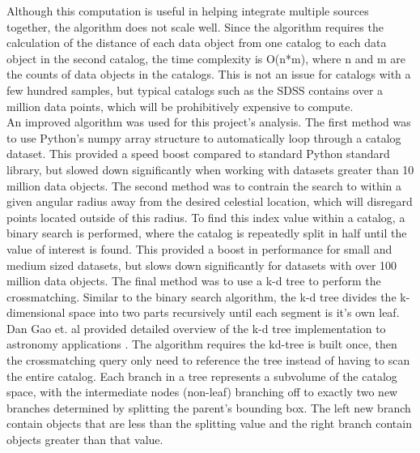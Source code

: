 \documentclass[11pt,sigconf]{acmart}
\begin{document}
Although this computation is useful in helping integrate multiple sources together, 
the algorithm does not scale well. Since the algorithm requires the calculation of
the distance of each data object from one catalog to each data object in the second
catalog, the time complexity is O(n*m), where n and m are the counts of data objects
in the catalogs. This is not an issue for catalogs with a few hundred samples,
but typical catalogs such as the SDSS contains over a million data points, which will
be prohibitively expensive to compute.
\\
An improved algorithm was used for this project's analysis. The first method was to
use Python's numpy array structure to automatically loop through a catalog dataset. This
provided a speed boost compared to standard Python standard library, but slowed down
significantly when working with datasets greater than 10 million data objects. The second
method was to contrain the search to within a given angular radius away from the desired
celestial location, which will disregard points located outside of this radius. To find
this index value within a catalog, a binary search is performed, where the catalog is 
repeatedly split in half until the value of interest is found. This provided a boost in
performance for small and medium sized datasets, but slows down significantly for datasets 
with over 100 million data objects. The final method was to use a k-d tree to perform
the crossmatching. Similar to the binary search algorithm, the k-d tree divides the 
k-dimensional space into two parts recursively until each segment is it's own leaf.  
\\
Dan Gao et. al provided detailed overview of the k-d tree implementation to astronomy 
applications \cite{dangao}. The algorithm requires the kd-tree is built once, then 
the crossmatching query only need to reference the tree instead of having to scan 
the entire catalog. Each branch in a tree represents a subvolume of the catalog space, 
with the intermediate nodes (non-leaf) branching off to exactly two new branches 
determined by splitting the parent's bounding box. The left new branch contain objects 
that are less than the splitting value and the right branch contain objects greater 
than that value.
\end{document}
